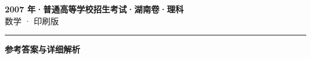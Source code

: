 \documentclass[zihao=5, a4paper]{ctexart}
\begin{document}
\begin{center}
  {\Large\bfseries 2007 年·普通高等学校招生考试·湖南卷·理科}\\[4pt]
  {\large 数学 · 印刷版}
\end{center}
\medskip
{}

\par\bigskip\hrule\bigskip
{}
\begin{center}{\large\bfseries 参考答案与详细解析}\end{center}
\smallskip

\end{document}
